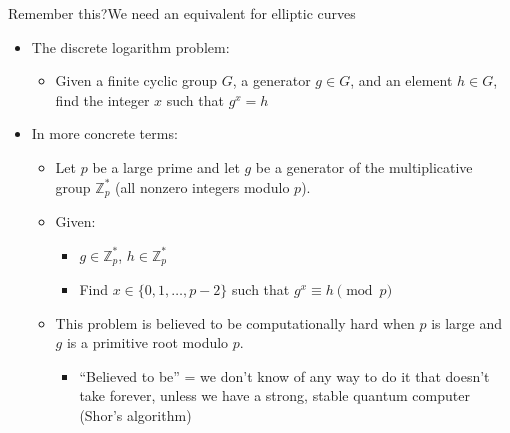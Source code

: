\ifdefined\PRESENTATION\else\PassOptionsToClass{handout}{beamer}\fi\documentclass[aspectratio=169, lualatex]{beamer}
\begin{document}
\begin{frame}{Remember this?}{We need an equivalent for elliptic curves}
	\begin{itemize}
		\item The discrete logarithm problem:
		      \begin{itemize}
			      \item Given a finite cyclic group $G$, a generator $g \in G$, and an element
			            $h \in G$, find the integer $x$ such that $g^{x}=h$
		      \end{itemize}
		\item In more concrete terms:
		      \begin{itemize}
			      \item Let $p$ be a large prime and let $g$ be a generator of the multiplicative
			            group $\mathbb{Z}_{p}^{*}$ (all nonzero integers modulo $p$).
			      \item Given:
			            \begin{itemize}
				            \item $g \in \mathbb{Z}_{p}^{*}$, $h \in \mathbb{Z}_{p}^{*}$

				            \item Find $x \in \{0, 1, \ldots, p-2\}$ such that $g^{x} \equiv h \pmod
					                  {p}$
			            \end{itemize}
			      \item This problem is believed to be computationally hard when $p$ is large
			            and $g$ is a primitive root modulo $p$.
			            \begin{itemize}
				            \item ``Believed to be'' = we don't know of any way to do it that doesn't
				                  take forever, unless we have a strong, stable quantum computer (Shor's
				                  algorithm)
			            \end{itemize}
		      \end{itemize}
	\end{itemize}
\end{frame}
\end{document}
